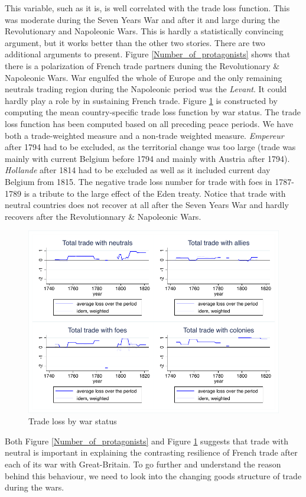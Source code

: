 \documentclass[12pt,a4paper,notitlepage,english]{article}
\begin{document}
This variable, such as it is, is well correlated with the trade loss function. This was moderate during the Seven Years War and after it and large during the Revolutionary and Napoleonic Wars.
This is hardly a statistically convincing argument, but it works better than the other two stories. 
There are two additional arguments to present.
Figure \ref{Number_of_protagonists} shows that there is a polarization of French trade partners duning the Revolutionary \& Napoleonic Wars.
War engulfed the whole of Europe and the only remaining neutrals trading region during the Napoleonic period was the \textit{Levant}.
It could hardly play a role by in sustaining French trade.
Figure \ref{loss_by_war_status_XI} is constructed by computing the mean country-specific trade loss function by war status. The trade loss function has been computed based on all preceding peace periods.
We have both a trade-weighted measure and a non-trade weighted measure.
\textit{Empereur} after 1794 had to be excluded, as the territorial change was too large (trade was mainly with current Belgium before 1794 and mainly with Austria after 1794).
\textit{Hollande} after 1814 had to be excluded as well as it included current day Belgium from 1815.
The negative trade loss number for trade with foes in 1787-1789 is a tribute to the large effect of the Eden treaty.
Notice that trade with neutral countries does not recover at all after the Seven Years War and hardly recovers after the Revolutionnary \& Napoleonic Wars. 

\begin{center}
\begin{figure}[H]
\centering
\caption{Trade loss by war status}
\label{loss_by_war_status_XI}
\includegraphics[scale=1.2]{loss_by_war_status_XI.pdf}
\end{figure}
\end{center}
Both  Figure \ref{Number_of_protagonists} and Figure \ref{loss_by_war_status_XI} suggests that trade with neutral is important in explaining the contrasting resilience of French trade after each of its war with Great-Britain.
To go further and understand the reason behind this behaviour, we need to look into the changing goods structure of trade during the wars.
\end{document}
